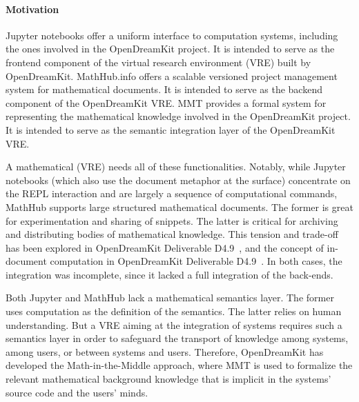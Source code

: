 
\paragraph{Motivation}
Jupyter notebooks offer a uniform interface to computation systems, including the ones involved in the OpenDreamKit project.
It is intended to serve as the frontend component of the virtual research environment (VRE) built by OpenDreamKit.
MathHub.info offers a scalable versioned project management system for mathematical documents.
It is intended to serve as the backend component of the OpenDreamKit VRE.
MMT provides a formal system for representing the mathematical knowledge involved in the OpenDreamKit project.
It is intended to serve as the semantic integration layer of the OpenDreamKit VRE.

A mathematical (VRE) needs all of these functionalities.
Notably, while Jupyter notebooks (which also use the document metaphor at the surface) concentrate on the REPL interaction and are largely a sequence of computational commands, MathHub supports large structured mathematical documents.
The former is great for experimentation and sharing of snippets. The latter is critical for archiving and distributing bodies of mathematical knowledge.
This tension and trade-off has been explored in OpenDreamKit Deliverable D4.9~\cite{ODK-D4.2}, and the concept of in-document computation in OpenDreamKit Deliverable D4.9~\cite{ODK-D4.9}.
In both cases, the integration was incomplete, since it lacked a full integration of the back-ends.

Both Jupyter and MathHub lack a mathematical semantics layer.
The former uses computation as the definition of the semantics.
The latter relies on human understanding.
But a VRE aiming at the integration of systems requires such a semantics layer in order to safeguard the transport of knowledge among systems, among users, or between systems and users.
Therefore, OpenDreamKit has developed the Math-in-the-Middle approach, where MMT is used to formalize the relevant mathematical background knowledge that is implicit in the systems' source code and the users' minds.

